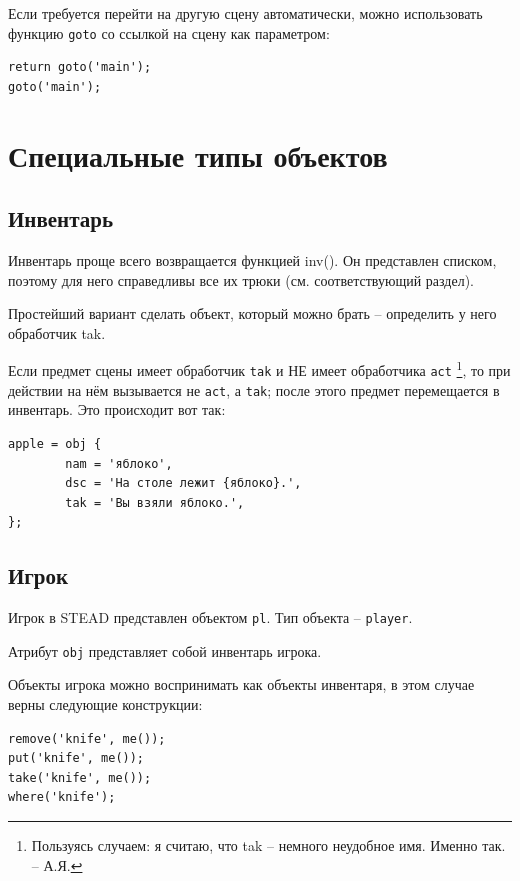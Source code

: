 \documentclass[a4paper,12pt]{article}
\begin{document}
Если требуется перейти на другую сцену автоматически, можно использовать функцию \verb/goto/ со ссылкой на сцену как параметром:

\begin{verbatim}
return goto('main');
goto('main');
\end{verbatim}

\section{Специальные типы объектов}

\subsection{Инвентарь}


Инвентарь проще всего возвращается функцией inv(). Он представлен списком, поэтому для него справедливы все их трюки (см. соответствующий раздел).

Простейший вариант сделать объект, который можно брать -- определить у него обработчик tak.

Если предмет сцены имеет обработчик \verb/tak/ и НЕ имеет обработчика \verb/act/ \footnote{Пользуясь случаем: я считаю, что tak -- немного неудобное имя. Именно так. -- А.Я.}, то при действии на нём вызывается не \verb/act/, а \verb/tak/; после этого предмет перемещается в инвентарь. Это происходит вот так:

\begin{verbatim}
apple = obj {
        nam = 'яблоко',
        dsc = 'На столе лежит {яблоко}.',
        tak = 'Вы взяли яблоко.',
};
\end{verbatim}

\subsection{Игрок}

Игрок в STEAD представлен объектом \verb/pl/. Тип объекта -- \verb/player/.

Атрибут \verb/obj/ представляет собой инвентарь игрока.

Объекты игрока можно воспринимать как объекты инвентаря, в этом случае верны следующие конструкции:

\begin{verbatim}
remove('knife', me());
put('knife', me());
take('knife', me());
where('knife');
\end{verbatim}
\end{document}
